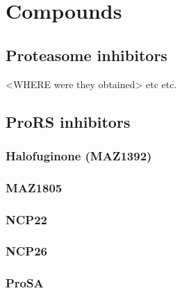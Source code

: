\section{Compounds}

\subsection{Proteasome inhibitors}
<WHERE were they obtained> etc etc.

\subsection{ProRS inhibitors}

\subsubsection{Halofuginone (MAZ1392)}

\subsubsection{MAZ1805}

\subsubsection{NCP22}

\subsubsection{NCP26}

\subsubsection{ProSA}




